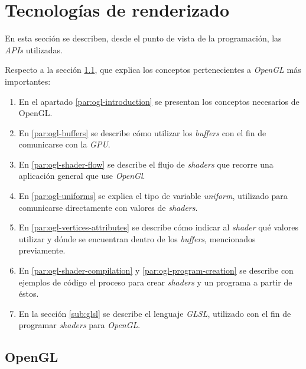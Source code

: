 \section{Tecnologías de renderizado} \label{sec:render-technologies}
En esta sección se describen, desde el punto de vista de la programación, las \textit{APIs} utilizadas.

Respecto a la sección \ref{sub:opengl}, que explica los conceptos pertenecientes a \textit{OpenGL} más importantes:
\begin{enumerate}

    \item En el apartado \ref{par:ogl-introduction} se presentan los conceptos necesarios de OpenGL. 
    
    \item En \ref{par:ogl-buffers} se describe cómo utilizar los \textit{buffers} con el fin de comunicarse con la \textit{GPU}.

    \item En \ref{par:ogl-shader-flow} se describe el flujo de \textit{shaders} que recorre una aplicación general que use \textit{OpenGl}.

    \item En \ref{par:ogl-uniforms} se explica el tipo de variable \textit{uniform}, utilizado para comunicarse directamente con valores de \textit{shaders}.

    \item En \ref{par:ogl-vertices-attributes} se describe cómo indicar al \textit{shader} qué valores utilizar y dónde se encuentran dentro de los \textit{buffers}, mencionados previamente.

    \item En \ref{par:ogl-shader-compilation} y \ref{par:ogl-program-creation} se describe con ejemplos de código el proceso para crear \textit{shaders} y un programa a partir de éstos.

    \item En la sección \ref{sub:glsl} se describe el lenguaje \textit{GLSL}, utilizado con el fin de programar \textit{shaders} para \textit{OpenGL}.
    
\end{enumerate}



\subsection{OpenGL} \label{sub:opengl}

